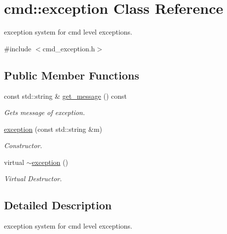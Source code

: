 \hypertarget{classcmd_1_1exception}{\section{cmd\-:\-:exception Class Reference}
\label{classcmd_1_1exception}
}


exception system for cmd level exceptions.  




{\ttfamily \#include $<$cmd\-\_\-exception.\-h$>$}

\subsection*{Public Member Functions}
\begin{DoxyCompactItemize}
\item 
\hypertarget{classcmd_1_1exception_a432688fc0fe4b5db880caee4cdccf521}{const std\-::string \& \hyperlink{classcmd_1_1exception_a432688fc0fe4b5db880caee4cdccf521}{get\-\_\-message} () const }\label{classcmd_1_1exception_a432688fc0fe4b5db880caee4cdccf521}

\begin{DoxyCompactList}\small\item\em Gets message of exception. \end{DoxyCompactList}\item 
\hyperlink{classcmd_1_1exception_a88d53316e2e387daa22889d2be7fb641}{exception} (const std\-::string \&m)
\begin{DoxyCompactList}\small\item\em Constructor. \end{DoxyCompactList}\item 
\hypertarget{classcmd_1_1exception_afa9a99039e2fd9b110b466e2a2e03613}{virtual \hyperlink{classcmd_1_1exception_afa9a99039e2fd9b110b466e2a2e03613}{$\sim$exception} ()}\label{classcmd_1_1exception_afa9a99039e2fd9b110b466e2a2e03613}

\begin{DoxyCompactList}\small\item\em Virtual Destructor. \end{DoxyCompactList}\end{DoxyCompactItemize}


\subsection{Detailed Description}
exception system for cmd level exceptions. 

